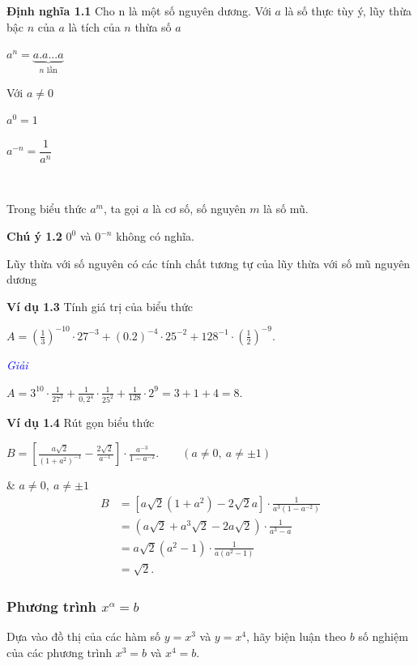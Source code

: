 \documentclass{article}
\begin{document}
\textbf{Định nghĩa 1.1} {Cho n là một số nguyên dương.
Với $a$ là số thực tùy ý, lũy thừa bậc $n$ của $a$ là tích của $n$ thừa số $a$}\\
\centerline{$a^n=\underset{n \text{ lần}}{\underbrace{a.a...a}}$}
Với $a\ne 0$

\centerline{$a^0  = 1$}
\centerline{$a^{-n} = \dfrac{1}{a^n}$}\

Trong biểu thức $a^m$, ta gọi $a$ là cơ số, số nguyên $m$ là số mũ.

\textbf{Chú ý 1.2} {$0^0$ và $0^{−n}$ không có nghĩa.}

Lũy thừa với số nguyên có các tính chất tương tự của lũy thừa với số mũ nguyên dương
 
 \textbf{Ví dụ 1.3} {Tính giá trị của biểu thức}

\vspace{0.3cm}

\centerline{$
A=\left(\frac{1}{3}\right)^{-10}\cdot 27^{-3}
+\left(0.2\right)^{-4}\cdot 25^{-2}
+128^{-1}\cdot\left(\frac{1}{2}\right)^{-9}.
$}

\vspace{0.3cm}

\textcolor{blue}{\textit{Giải}}

\centerline{$A=3^{10}\cdot\frac{1}{27^3}
+\frac{1}{0,2^4}\cdot\frac{1}{25^2}
+\frac{1}{128}\cdot2^9
=3+1+4=8.$}

\vspace{0.3cm}

\textbf{Ví dụ 1.4} {Rút gọn biểu thức}

\centerline{$
B=\left[\frac{a\sqrt{2}}{(1+a^2)^{-1}}-\frac{2\sqrt{2}}{{a}^{-1}}\right]\cdot\frac{a^{-3}}{1-a^{-2}}.
\qquad (a\ne0,\ a\ne\pm1)$}


\textcolor{blue}{}& $a\ne0,\ a\ne\pm1$ \\
\[
\begin{aligned}
B &= \left[a\sqrt{2}(1+a^2)-2\sqrt{2}a\right]\cdot\frac{1}{a^3(1-a^{-2})}\\
  &= (a\sqrt{2}+a^3\sqrt{2}-2a\sqrt{2})\cdot\frac{1}{a^3-a}\\
  &= a\sqrt{2}(a^2-1)\cdot\frac{1}{a(a^2-1)}\\
  &= \sqrt{2}.
\end{aligned}
\]

\subsubsection{Phương trình $x^{\alpha} = b$}
Dựa vào đồ thị của các hàm số $y = x^3$ và $y = x^4$, hãy biện luận theo $b$ số nghiệm của các
phương trình $x^3 = b$ và $x^4 = b$.
\end{document}
